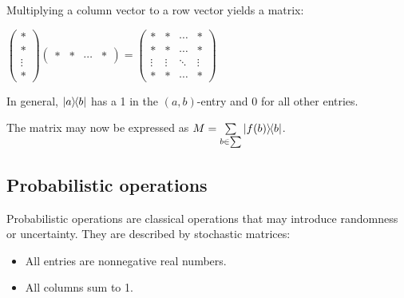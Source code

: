 Multiplying a column vector to a row vector yields a matrix:
\begin{center}
    $\begin{pmatrix}
        * \\
        * \\
        \vdots \\
        *
    \end{pmatrix}
        \begin{pmatrix}
        * & * & \cdots & *
    \end{pmatrix}
    =
    \begin{pmatrix}
        * & * & \cdots & * \\
        * & * & \cdots & * \\
        \vdots & \vdots & \ddots & \vdots \\
        * & * & \cdots & *
    \end{pmatrix}$
\end{center}

In general, $\ket{a}\hspace{-0.3em}\bra{b}$ has a 1 in the $(a,b)$-entry and 0 for all other entries.

\bigbreak

The matrix may now be expressed as $M=\sum\limits_{b\in\sum}\ket{f(b)}\hspace{-0.3em}\bra{b}$.

\subsection{Probabilistic operations}
Probabilistic operations are classical operations that may introduce randomness or uncertainty. They are described by stochastic matrices:
\begin{itemize}
    \item All entries are nonnegative real numbers.
    \item All columns sum to 1.
\end{itemize}


